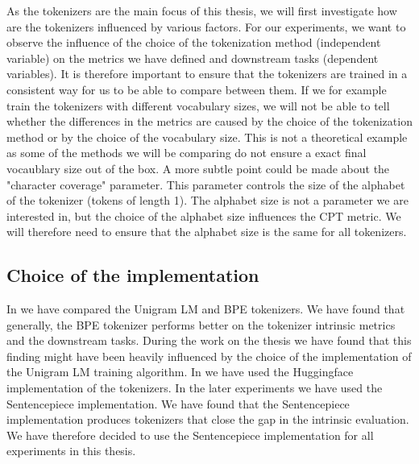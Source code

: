 
As the tokenizers are the main focus of this thesis, we will first investigate how are the tokenizers influenced by various factors. For our experiments, we want to observe the influence of the choice of the tokenization method (independent variable) on the metrics we have defined and downstream tasks (dependent variables). It is therefore important to ensure that the tokenizers are trained in a consistent way for us to be able to compare between them. If we for example train the tokenizers with different vocabulary sizes, we will not be able to tell whether the differences in the metrics are caused by the choice of the tokenization method or by the choice of the vocabulary size. This is not a theoretical example as some of the methods we will be comparing do not ensure a exact final vocaublary size out of the box. A more subtle point could be made about the "character coverage" parameter. This parameter controls the size of the alphabet of the tokenizer (tokens of length 1). The alphabet size is not a parameter we are interested in, but the choice of the alphabet size influences the CPT metric. We will therefore need to ensure that the alphabet size is the same for all tokenizers.

\subsection{Choice of the implementation}

In \cite{limisiewicz_tokenization_2023} we have compared the Unigram LM and BPE tokenizers. We have found that generally, the BPE tokenizer performs better on the tokenizer intrinsic metrics and the downstream tasks. During the work on the thesis we have found that this finding might have been heavily influenced by the choice of the implementation of the Unigram LM training algorithm. In \cite{limisiewicz_tokenization_2023} we have used the Huggingface implementation of the tokenizers. In the later experiments we have used the Sentencepiece implementation. We have found that the Sentencepiece implementation produces tokenizers that close the gap in the intrinsic evaluation. We have therefore decided to use the Sentencepiece implementation for all experiments in this thesis.

